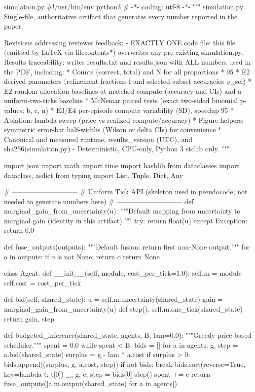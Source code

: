 \begin{filecontents*}{simulation.py}
#!/usr/bin/env python3
# -*- coding: utf-8 -*-
"""
simulation.py
Single-file, authoritative artifact that generates every number reported in the paper.

Revisions addressing reviewer feedback:
- EXACTLY ONE code file: this file (emitted by LaTeX via filecontents*) overwrites any pre-existing simulation.py.
- Results traceability: writes results.txt and results.json with ALL numbers used in the PDF, including:
  * Counts (correct, total) and N for all proportions
  * 95%
  * E2 derived parameters (refinement fractions f and selected-subset accuracies p_sel)
  * E2 random-allocation baselines at matched compute (accuracy and CIs) and a uniform-two-ticks baseline
  * McNemar paired tests (exact two-sided binomial p-values; b, c, n)
  * E3/E4 per-episode compute variability (SD), speedup 95%
  * Ablation: lambda sweep (price vs realized compute/accuracy)
  * Figure helpers: symmetric error-bar half-widths (Wilson or delta CIs) for convenience
  * Canonical and measured runtime, results_version (UTC), and sha256(simulation.py)
- Deterministic, CPU-only, Python 3 stdlib only.
"""

import json
import math
import time
import hashlib
from dataclasses import dataclass, asdict
from typing import List, Tuple, Dict, Any


# -----------------------------
# Uniform Tick API (skeleton used in pseudocode; not needed to generate numbers here)
# -----------------------------
def marginal_gain_from_uncertainty(u):
    """Default mapping from uncertainty to marginal gain (identity in this artifact)."""
    try:
        return float(u)
    except Exception:
        return 0.0


def fuse_outputs(outputs):
    """Default fusion: return first non-None output."""
    for o in outputs:
        if o is not None:
            return o
    return None


class Agent:
    def __init__(self, module, cost_per_tick=1.0):
        self.m = module
        self.cost = cost_per_tick

    def bid(self, shared_state):
        u = self.m.uncertainty(shared_state)
        gain = marginal_gain_from_uncertainty(u)
        def step():
            self.m.one_tick(shared_state)
        return gain, step


def budgeted_inference(shared_state, agents, B, lam=0.0):
    """Greedy price-based scheduler."""
    spent = 0.0
    while spent < B:
        bids = []
        for a in agents:
            g, step = a.bid(shared_state)
            surplus = g - lam * a.cost
            if surplus > 0:
                bids.append((surplus, g, a.cost, step))
        if not bids:
            break
        bids.sort(reverse=True, key=lambda t: t[0])
        _, g, c, step = bids[0]
        step()
        spent += c
    return fuse_outputs([a.m.output(shared_state) for a in agents])



\end{filecontents*}

